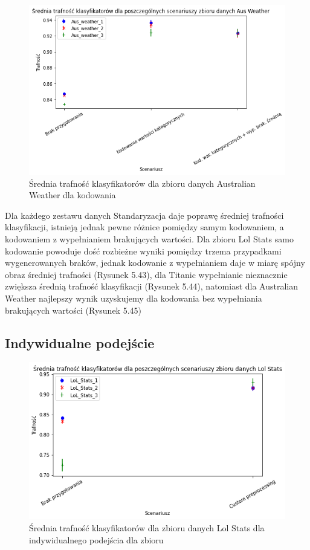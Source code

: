 \documentclass{book}
\begin{document}
\begin{figure}[H]
    \centerline{\includegraphics[scale=0.8]{Aus_Weather_Avg_Kodowanie}}
    \centering
    \caption{Średnia trafność klasyfikatorów dla zbioru danych Australian Weather 
    dla kodowania}
    \end{figure}

    Dla każdego zestawu danych Standaryzacja daje poprawę 
    średniej trafności klasyfikacji, istnieją jednak pewne 
    różnice pomiędzy samym kodowaniem, a kodowaniem z 
    wypełnianiem brakujących wartości. Dla zbioru Lol 
    Stats samo kodowanie powoduje dość rozbieżne wyniki 
    pomiędzy trzema przypadkami wygenerowanych braków, 
    jednak kodowanie z wypełnianiem daje w miarę spójny 
    obraz średniej trafności (Rysunek 5.43), dla Titanic 
    wypełnianie nieznacznie zwiększa średnią trafność 
    klasyfikacji (Rysunek 5.44), natomiast dla Australian Weather
    najlepszy wynik uzyskujemy dla kodowania bez wypełniania brakujących wartości (Rysunek 5.45)

\subsection{Indywidualne podejście}

\begin{figure}[H]
    \centerline{\includegraphics[scale=0.8]{Lol_Stats_Avg_Custom}}
    \centering
    \caption{Średnia trafność klasyfikatorów dla zbioru danych Lol Stats 
    dla indywidualnego podejścia dla zbioru}
    \end{figure}
\end{document}
